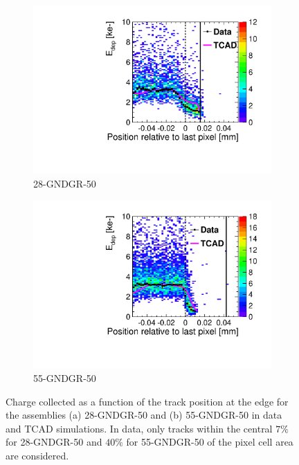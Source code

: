 \begin{figure}[htbp]
  \begin{subfigure}[b]{0.45\textwidth}
    \centering
    \includegraphics[width=\textwidth]{figures/ActiveEdge/28_GNDGR_Edep_TCAD_data.pdf}
    \caption{28-GNDGR-50}
  \end{subfigure}\hfill
  \begin{subfigure}[b]{0.45\textwidth}
    \centering
    \includegraphics[width=\textwidth]{figures/ActiveEdge/55_GNDGR_Edep_TCAD_data.pdf}
    \caption{55-GNDGR-50}
  \end{subfigure}
  \caption{Charge collected as a function of the track position at the
    edge for the assemblies (a) 28-GNDGR-50 and (b) 55-GNDGR-50 in
    data and TCAD simulations. In data, only tracks within the central
    $7\%$ for 28-GNDGR-50 and $40\%$ for 55-GNDGR-50 of the pixel cell
    area are considered.}
  \label{fig:ChargeCollectionNGRFGR_50}
\end{figure}



